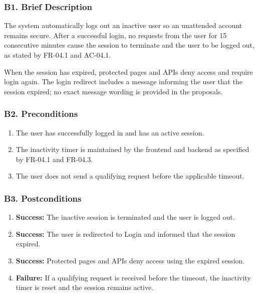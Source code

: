 \documentclass[12pt]{article}
\begin{document}
\subsubsection*{B1. Brief Description}
\par\medskip

The system automatically logs out an inactive user so an unattended account remains secure. After a successful login, no requests from the user for 15 consecutive minutes cause the session to terminate and the user to be logged out, as stated by FR-04.1 and AC-04.1.
\par\medskip

When the session has expired, protected pages and APIs deny access and require login again. The login redirect includes a message informing the user that the session expired; no exact message wording is provided in the proposals.
\par\medskip

\hypertarget{sec:b2-preconditions}{}
\subsubsection*{B2. Preconditions}
\par\medskip

\begin{enumerate}
\item The user has successfully logged in and has an active session.
\item The inactivity timer is maintained by the frontend and backend as specified by FR-04.1 and FR-04.3.
\item The user does not send a qualifying request before the applicable timeout.
\end{enumerate}
\par\medskip

\hypertarget{sec:b3-postconditions}{}
\subsubsection*{B3. Postconditions}
\par\medskip

\begin{enumerate}
\item \textbf{Success:} The inactive session is terminated and the user is logged out.
\item \textbf{Success:} The user is redirected to Login and informed that the session expired.
\item \textbf{Success:} Protected pages and APIs deny access using the expired session.
\item \textbf{Failure:} If a qualifying request is received before the timeout, the inactivity timer is reset and the session remains active.
\end{enumerate}
\par\medskip
\end{document}
